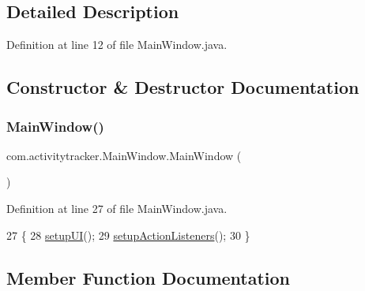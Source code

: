 \subsection{Detailed Description}


Definition at line 12 of file Main\+Window.\+java.



\subsection{Constructor \& Destructor Documentation}
\mbox{\label{classcom_1_1activitytracker_1_1_main_window_a77d0ebef154786202a165f496dc70065}} 
\subsubsection{\texorpdfstring{Main\+Window()}{MainWindow()}}
{\footnotesize\ttfamily com.\+activitytracker.\+Main\+Window.\+Main\+Window (\begin{DoxyParamCaption}{ }\end{DoxyParamCaption})\hspace{0.3cm}{\ttfamily [package]}}



Definition at line 27 of file Main\+Window.\+java.


\begin{DoxyCode}
27                  \{
28         \mbox{\hyperlink{classcom_1_1activitytracker_1_1_main_window_a53a019623a37b950473359fc625b6423}{setupUI}}();
29         \mbox{\hyperlink{classcom_1_1activitytracker_1_1_main_window_a76b3e8567b228ccd26f09c15ebaddb72}{setupActionListeners}}();
30     \}
\end{DoxyCode}


\subsection{Member Function Documentation}
\mbox{\label{classcom_1_1activitytracker_1_1_main_window_a62e9c6f477ccc5b93aff33abb567fde4}} 

